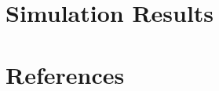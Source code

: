 \documentclass[review]{elsarticle}
\theoremstyle{plain}
\theoremstyle{definition}
\theoremstyle{remark}
\begin{document}
\section{Simulation Results}


\section*{References}

\end{document}
